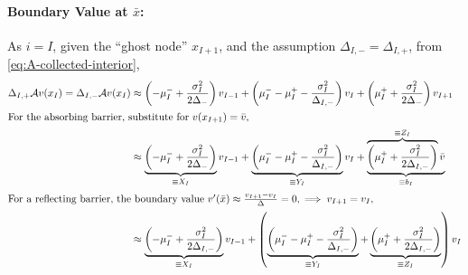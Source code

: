 \documentclass[11pt]{etk-article}
\begin{document}
\paragraph{Boundary Value at $\bar{x}$:}
As $i=I$, given the ``ghost node'' $x_{I+1}$, and the assumption  $\Delta_{I,-} = \Delta_{I,+}$, from \cref{eq:A-collected-interior},
\begin{align}
\Delta_{I,+} \mathcal{A} v(x_I) = \Delta_{I,-} \mathcal{A} v(x_I)&\approx \left(-\mu_I^{-} +\frac{\sigma_I^2}{2 \Delta_{-}}\right)v_{I-1} + \left(\mu_I^{-} - \mu_I^{+}-\frac{\sigma_I^2}{\Delta_{I,-}}\right)v_I + \left(\mu_I^{+} + \frac{\sigma_I^2}{2 \Delta_{-}}\right)v_{I+1}\\
\intertext{For the absorbing barrier, substitute for $v(x_{I+1}) = \bar{v}$,}
&\approx \underbrace{\left(-\mu_I^{-} +\frac{\sigma_I^2}{2 \Delta_{-}}\right)}_{\equiv X_I} v_{I-1} + \underbrace{\left(\mu_I^{-} - \mu_I^{+}-\frac{\sigma_I^2}{\Delta_{I,-}}\right)}_{\equiv Y_I} v_I + \underbrace{\overbrace{\left(\mu_I^{+} + \frac{\sigma_I^2}{2 \Delta_{I,-}}\right)}^{\equiv Z_I}\bar{v}}_{\equiv b_I}\\
\intertext{For a reflecting barrier, the boundary value $v'(\bar{x}) \approx \frac{v_{I+1}-v_I}{\Delta} = 0, \implies v_{I+1} = v_I$,}
&\approx \underbrace{\left(-\mu_I^{-} +\frac{\sigma_I^2}{2 \Delta_{I,-}}\right)}_{\equiv X_I} v_{I-1} + \left(\underbrace{\left(\mu_I^{-} - \mu_I^{+}-\frac{\sigma_I^2}{\Delta_{I,-}}\right)}_{\equiv Y_I} + \underbrace{\left(\mu_I^{+} + \frac{\sigma_I^2}{2 \Delta_{I,-}}\right)}_{\equiv Z_I} \right) v_I \label{eq:reflecting-right-nonuniform}
\end{align}
\end{document}
